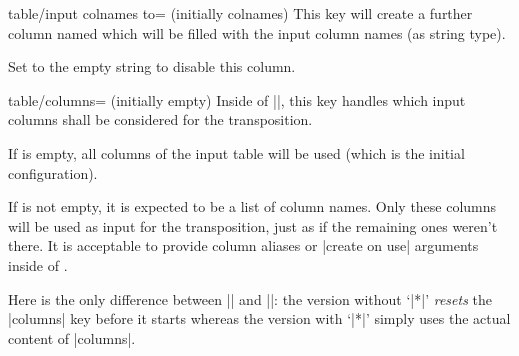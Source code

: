 \documentclass[a4paper]{ltxdoc}
\begin{document}
\begin{commandlist}
\begin{pgfplotskey}{table/input colnames to= (initially colnames)}
        This key will create a further column named  which will be
        filled with the input column names (as string type).
\begin{codeexample}[]
\pgfplotstabletranspose[input colnames to=Input]
\loadedtable
\end{codeexample}
        Set  to the empty string to disable this column.
\begin{codeexample}[]
\pgfplotstabletranspose[input colnames to=]
\loadedtable
\end{codeexample}
    \end{pgfplotskey}

    \begin{pgfplotskey}{table/columns= (initially empty)}
        Inside of |\pgfplotstabletranspose|, this key handles which input
        columns shall be considered for the transposition.

        If  is empty, all columns of the input table will be used
        (which is the initial configuration).

        If  is not empty, it is expected to be a list of column
        names. Only these columns will be used as input for the transposition,
        just as if the remaining ones weren't there. It is acceptable to
        provide column aliases or |create on use| arguments inside of
        .
\begin{codeexample}[]
\pgfplotstabletranspose[columns={a,b}]
\loadedtable
\end{codeexample}

        Here is the only difference between |\pgfplotstabletranspose| and
        |\pgfplotstabletranspose*|: the version without `|*|' \emph{resets} the
        |columns| key before it starts whereas the version with `|*|' simply
        uses the actual content of |columns|.
    \end{pgfplotskey}
\end{commandlist}
\end{document}
